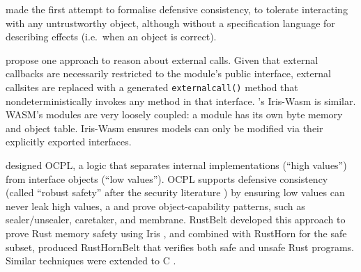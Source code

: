 \citet{Murray10dphil} made the first attempt to formalise defensive
consistency, %
to tolerate interacting with any untrustworthy object,
although without a specification language for describing effects
(i.e.\ when an object is correct).

 \citet{CassezFQ24} propose one approach to reason about external calls.
Given that external callbacks are necessarily restricted to the module's public interface,
external callsites are replaced  with a
generated \texttt{externalcall()} method that  nondeterministically invokes any method in that interface.
\citet{iris-wasm-pldi2023}'s Iris-Wasm is similar.
WASM's
modules are very loosely coupled: a module
has its own byte memory
and object table.
Iris-Wasm ensures models 
can only be
modified via their explicitly exported interfaces. 
 
 

\citet{ddd}  designed OCPL, a logic
that separates internal implementations (``high values'')
from interface objects
(``low values''). %
OCPL supports defensive
consistency %
(called ``robust safety'' after the
security literature \cite{Bengtson})
by ensuring
low values can never leak high values, a %
and 
prove %
object-capability patterns, such as
sealer/unsealer, caretaker, and membrane.
%
%
RustBelt \cite{RustBelt18}
developed this approach to prove Rust memory safety using Iris \cite{iris-jfp2018},
and combined with RustHorn \cite{RustHorn-toplas2021} for the safe subset,
produced RustHornBelt \cite{RustHornBelt-pldi2022} that verifies
both safe and unsafe Rust programs. %
Similar techniques were extended to C \cite{RefinedC-pldi2021}.

